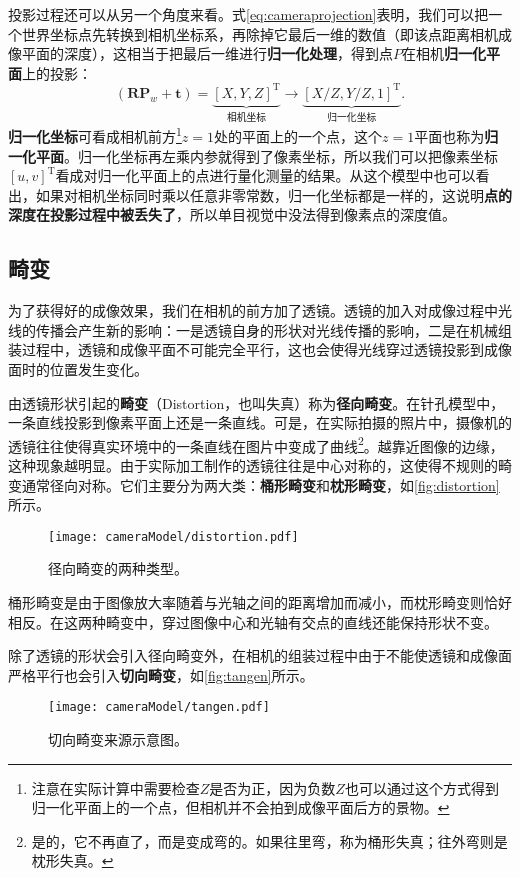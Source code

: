 投影过程还可以从另一个角度来看。式\eqref{eq:cameraprojection}表明，我们可以把一个世界坐标点先转换到相机坐标系，再除掉它最后一维的数值（即该点距离相机成像平面的深度），这相当于把最后一维进行\textbf{归一化处理}，得到点$P$在相机\textbf{归一化平面}上的投影：
\begin{equation}
\left( {\bm{R}{\bm{P}_w} + \bm{t}} \right) = \underbrace{\left[ X,Y,Z\right]^\mathrm{T}}_{\text{相机坐标}} \to \underbrace {\left[ {X/Z,Y/Z,1} \right]^\mathrm{T}}_{\text{归一化坐标}}.
\end{equation}
\textbf{归一化坐标}可看成相机前方\footnote{注意在实际计算中需要检查$Z$是否为正，因为负数$Z$也可以通过这个方式得到归一化平面上的一个点，但相机并不会拍到成像平面后方的景物。}$z=1$处的平面上的一个点，这个$z=1$平面也称为\textbf{归一化平面}。归一化坐标再左乘内参就得到了像素坐标，所以我们可以把像素坐标$[u,v]^\mathrm{T}$看成对归一化平面上的点进行量化测量的结果。从这个模型中也可以看出，如果对相机坐标同时乘以任意非零常数，归一化坐标都是一样的，这说明\textbf{点的深度在投影过程中被丢失了}，所以单目视觉中没法得到像素点的深度值。

\subsection{畸变}
为了获得好的成像效果，我们在相机的前方加了透镜。透镜的加入对成像过程中光线的传播会产生新的影响：一是透镜自身的形状对光线传播的影响，二是在机械组装过程中，透镜和成像平面不可能完全平行，这也会使得光线穿过透镜投影到成像面时的位置发生变化。

由透镜形状引起的\textbf{畸变}（Distortion，也叫失真）称为\textbf{径向畸变}。在针孔模型中，一条直线投影到像素平面上还是一条直线。可是，在实际拍摄的照片中，摄像机的透镜往往使得真实环境中的一条直线在图片中变成了曲线\footnote{是的，它不再直了，而是变成弯的。如果往里弯，称为桶形失真；往外弯则是枕形失真。}。越靠近图像的边缘，这种现象越明显。由于实际加工制作的透镜往往是中心对称的，这使得不规则的畸变通常径向对称。它们主要分为两大类：\textbf{桶形畸变}和\textbf{枕形畸变}，如\autoref{fig:distortion}所示。
\begin{figure}[!t]
    \centering
    \texttt{[image: cameraModel/distortion.pdf]}
    \caption{径向畸变的两种类型。}
    \label{fig:distortion}
\end{figure}

桶形畸变是由于图像放大率随着与光轴之间的距离增加而减小，而枕形畸变则恰好相反。在这两种畸变中，穿过图像中心和光轴有交点的直线还能保持形状不变。

除了透镜的形状会引入径向畸变外，在相机的组装过程中由于不能使透镜和成像面严格平行也会引入\textbf{切向畸变}，如\autoref{fig:tangen}所示。
\begin{figure}[!t]
    \centering
    \texttt{[image: cameraModel/tangen.pdf]}
    \caption{切向畸变来源示意图。}
    \label{fig:tangen}
\end{figure}

